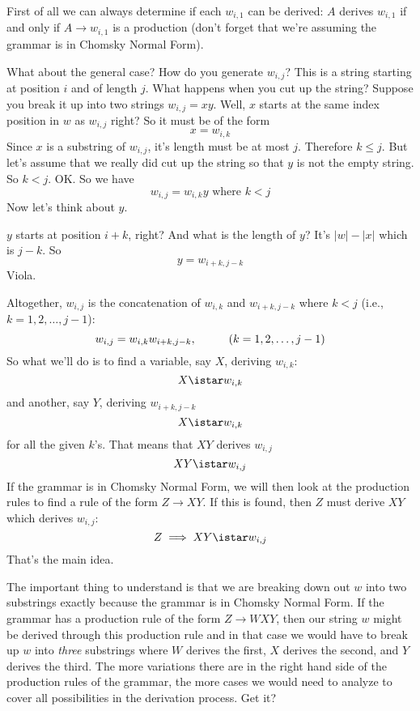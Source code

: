 

\newpage
First of all we can always determine if each $w_{i,1}$ can be
derived:
$A$ derives $w_{i,1}$ if and only if $A \rightarrow w_{i,1}$ is a production
(don't forget that we're assuming the grammar is in Chomsky Normal Form).


What about the general case?
How do you generate $w_{i,j}$?
This is a string starting at position $i$ and of length $j$.
What happens when you cut up the string?
Suppose you break it up into two strings $w_{i,j} = xy$.
Well, $x$ starts at the same index position in $w$ as $w_{i,j}$ right?
So it must be of the form
\[
x = w_{i,k}
\]
Since $x$ is a substring of $w_{i,j}$, it's length must be at most $j$.
Therefore $k \leq j$.
But let's assume that we really did cut up the string so that $y$ is not the 
empty string.
So $k < j$.
OK.
So we have
\[
  w_{i,j} = w_{i,k} y \text{ where } k < j
\]
Now let's think about $y$.

$y$ starts at position $i + k$, right?
And what is the length of $y$?
It's $|w| - |x|$ which is $j - k$.
So
\[
  y = w_{i + k, j - k}
\]
Viola.

Altogether, 
$w_{i,j}$ is the concatenation of $w_{i,k}$ and $w_{i+k, j-k}$
where $k < j$ (i.e., $k = 1, 2, \ldots, j - 1$):
\[
w_{i,j} = w_{i,k} w_{i+k, j-k}, \hskip 1cm (k = 1, 2, \ldots, j - 1)
\]
So what we'll do is
to find a variable, say $X$, deriving $w_{i,k}$:
\[
  X \istar w_{i,k}
\]
and 
another, say $Y$, deriving $w_{i+k, j-k}$
\[
  X \istar w_{i,k}
\]
for all the given $k$'s.
That means that $XY$ derives $w_{i,j}$
\[
  XY \istar w_{i,j}
\]
If the grammar is in Chomsky Normal Form, we will then look at the 
production rules to find a rule of the form $Z \rightarrow XY$.
If this is found, then $Z$ must derive $XY$ which derives $w_{i,j}$:
\[
  Z \implies XY \istar w_{i,j}
\]
That's the main idea.

The important thing to understand is that we are breaking down
out $w$ into two substrings exactly because the grammar is in
Chomsky Normal Form.
If the grammar has a production rule of the form
$Z \rightarrow WXY$, then our string $w$
might be derived through this production rule and in that case
we would have to break up $w$ into \textit{three} substrings
where $W$ derives the first, $X$ derives the second, and $Y$
derives the third.
The more variations there are in the right hand side of the
production rules of the grammar, the more cases
we would need to analyze to cover
all possibilities in the derivation process.
Get it?

